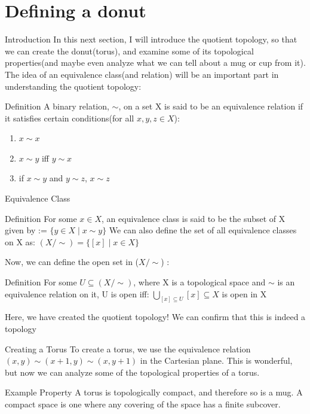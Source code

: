 \documentclass[aspectratio=169,xcolor=dvipsnames]{beamer}
\begin{document}
\section{Defining a donut}
\begin{frame}{Introduction}
    In this next section, I will introduce the quotient topology, so that we can create the donut(torus), and examine some of its topological properties(and maybe even analyze what we can tell about a mug or cup from it).\newline
    The idea of an equivalence class(and relation) will be an important part in understanding the quotient topology: \newline
   \begin{block}{Definition}
          A binary relation, $\sim$, on a set X is said to be an equivalence relation if it satisfies certain conditions(for all $x,y,z \in X$):
          \begin{enumerate}
              \item $x \sim x$
              \item $x \sim y$ iff $y \sim x$
              \item if $x\sim y$ and $y\sim z$, $x\sim z$
          \end{enumerate}
   \end{block}
    
\end{frame}
\begin{frame}{Equivalence Class}
    \begin{block}{Definition}
           For some $x \in X$, an equivalence class is said to be the subset of X given by \newline
           [x] := $\{y \in X \mid x \sim y\}$ We can also define the set of all equivalence classes on X as:
           \newline $(X/ \sim) = \{[x] \mid x\in X\}$
    \end{block}
    Now, we can define the open set in ($X/\sim$) :
    \begin{block}{Definition}
           For some $U \subseteq (X/\sim)$, where X is a topological space and $\sim$ is an equivalence relation on it, U is open iff: \newline
           $\bigcup_{[x] \subseteq U} [x] \subseteq X$ is open in X
    \end{block}
    Here, we have created the quotient topology! We can confirm that this is indeed a topology
\end{frame}
\begin{frame}{Creating a Torus}
    To create a torus, we use the equivalence relation $(x,y)\sim (x+1,y) \sim (x, y+1)$ in the Cartesian plane. This is wonderful, but now we can analyze some of the topological properties of a torus.
    \begin{block}{Example Property}
           A torus is topologically compact, and therefore so is a mug. A compact space is one where any covering of the space has a finite subcover. 
    \end{block}
    
\end{frame}
\end{document}
